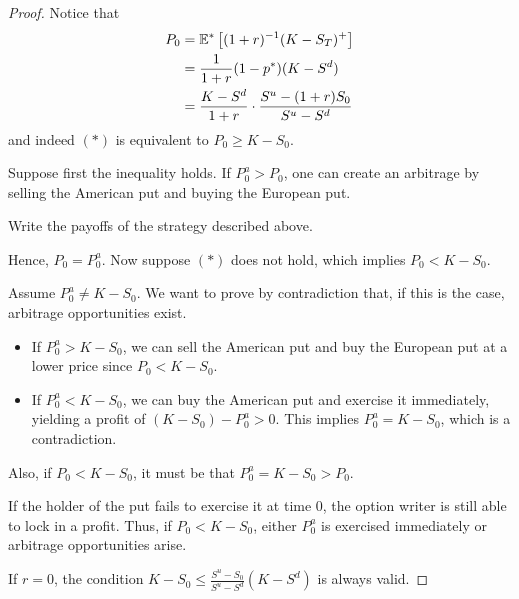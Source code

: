 \begin{proof}
    Notice that
    \begin{align*}
        P_0 &= \mathbb E^* \left[ (1+r)^{-1} (K - S_T)^+ \right] \\
        &= \frac{1}{1+r} (1 - p^*) (K - S^d) \\
        &= \frac{K - S^d}{1+r} \cdot \frac{S^u - (1+r)S_0}{S^u - S^d}
    \end{align*}
    and indeed $(*)$ is equivalent to $P_0 \geq K - S_0$.

    Suppose first the inequality holds. If $P_0^a > P_0$, one can create an arbitrage by selling the American put and buying the European put.
    
    \begin{homework}
        Write the payoffs of the strategy described above.
    \end{homework}
    
    Hence, $P_0 = P_0^a$. Now suppose $(*)$ does not hold, which implies $P_0 < K - S_0$.
    
    Assume $P_0^a \neq K - S_0$. We want to prove by contradiction that, if this is the case, arbitrage opportunities exist.
    \begin{itemize}
        \item If $P_0^a > K - S_0$, we can sell the American put and buy the European put at a lower price since $P_0 < K - S_0$.
        \item If $P_0^a < K - S_0$, we can buy the American put and exercise it immediately, yielding a profit of $(K - S_0) - P_0^a > 0$. This implies $P_0^a = K - S_0$, which is a contradiction.
    \end{itemize}
    Also, if $P_0 < K - S_0$, it must be that $P_0^a = K - S_0 > P_0$.
    
    If the holder of the put fails to exercise it at time 0, the option writer is still able to lock in a profit. Thus, if $P_0 < K - S_0$, either $P_0^a$ is exercised immediately or arbitrage opportunities arise.
    
    If $r = 0$, the condition $K - S_0 \leq \frac{S^u - S_0}{S^u - S^d} (K - S^d)$ is always valid.
\end{proof}

